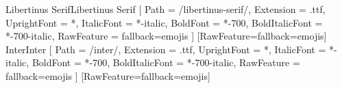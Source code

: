 %
%
\ifdefined\fuenteprincipal\else
  \def\fuenteprincipal{Libertinus Serif}
\fi
\ifdefined\fuentesans\else
  \def\fuentesans{Inter}
\fi
\ifdefined\fuentemono\else
  \def\fuentemono{JetBrains Mono}
\fi
\def\nombreLibertinus{Libertinus Serif}
\def\nombreInter{Inter}
\def\nombreJetBrains{JetBrains Mono}
\ifLuaTeX
  \ifdefined\carpetaFuentes
    \ifx\fuenteprincipal\nombreLibertinus
      \setmainfont{libertinus-serif}[
        Path           = {\carpetaFuentes/libertinus-serif/},
        Extension      = .ttf,
        UprightFont    = *,
        ItalicFont     = *-italic,
        BoldFont       = *-700,
        BoldItalicFont = *-700-italic,
        RawFeature     = {fallback=emojis}
      ]
    \else
      \setmainfont{\fuenteprincipal}[RawFeature={fallback=emojis}]
    \fi
    \ifx\fuentesans\nombreInter
      \setsansfont{inter}[
        Path           = {\carpetaFuentes/inter/},
        Extension      = .ttf,
        UprightFont    = *,
        ItalicFont     = *-italic,
        BoldFont       = *-700,
        BoldItalicFont = *-700-italic,
        RawFeature     = {fallback=emojis}
      ]
    \else
      \setsansfont{\fuentesans}[RawFeature={fallback=emojis}]
    \fi
